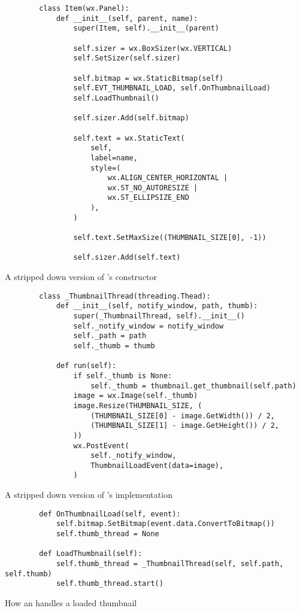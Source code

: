 \begin{listing}[p]
	\begin{verbatim}
		class Item(wx.Panel):
			def __init__(self, parent, name):
				super(Item, self).__init__(parent)

				self.sizer = wx.BoxSizer(wx.VERTICAL)
				self.SetSizer(self.sizer)

				self.bitmap = wx.StaticBitmap(self)
				self.EVT_THUMBNAIL_LOAD, self.OnThumbnailLoad)
				self.LoadThumbnail()

				self.sizer.Add(self.bitmap)

				self.text = wx.StaticText(
					self,
					label=name,
					style=(
						wx.ALIGN_CENTER_HORIZONTAL |
						wx.ST_NO_AUTORESIZE |
						wx.ST_ELLIPSIZE_END
					),
				)

				self.text.SetMaxSize((THUMBNAIL_SIZE[0], -1))

				self.sizer.Add(self.text)
	\end{verbatim}
	\caption{A stripped down version of 's constructor}
	\label{lst:mod:itemview:item}
\end{listing}

\begin{listing}[p]
	\begin{verbatim}
		class _ThumbnailThread(threading.Thead):
			def __init__(self, notify_window, path, thumb):
				super(_ThumbnailThread, self).__init__()
				self._notify_window = notify_window
				self._path = path
				self._thumb = thumb

			def run(self):
				if self._thumb is None:
					self._thumb = thumbnail.get_thumbnail(self.path)
				image = wx.Image(self._thumb)
				image.Resize(THUMBNAIL_SIZE, (
					(THUMBNAIL_SIZE[0] - image.GetWidth()) / 2,
					(THUMBNAIL_SIZE[1] - image.GetHeight()) / 2,
				))
				wx.PostEvent(
					self._notify_window,
					ThumbnailLoadEvent(data=image),
				)
	\end{verbatim}
	\caption{A stripped down version of 's
	implementation}
	\label{lst:mod:itemview:thumbnail}
\end{listing}

\begin{listing}[p]
	\begin{verbatim}
		def OnThumbnailLoad(self, event):
			self.bitmap.SetBitmap(event.data.ConvertToBitmap())
			self.thumb_thread = None

		def LoadThumbnail(self):
			self.thumb_thread = _ThumbnailThread(self, self.path, self.thumb)
			self.thumb_thread.start()
	\end{verbatim}
	\caption{How an  handles a loaded thumbnail}
	\label{lst:mod:itemview:item:thumbnail}
\end{listing}
